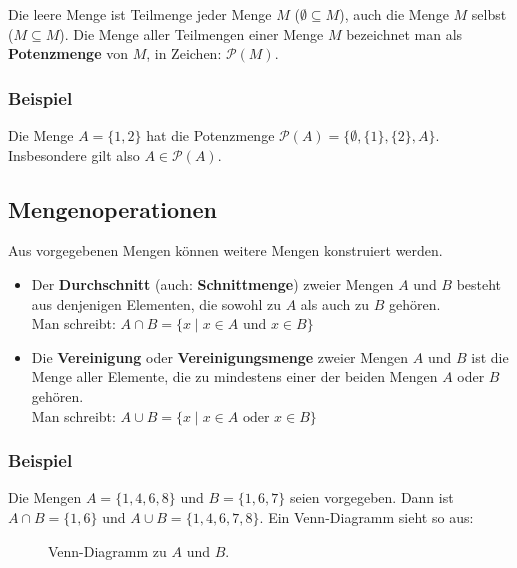 Die leere Menge ist Teilmenge jeder Menge $M$ ($\emptyset\subseteq M$), auch die Menge $M$ selbst ($M\subseteq M$). Die Menge aller Teilmengen einer Menge $M$ bezeichnet man als \textbf{Potenzmenge} von $M$, in Zeichen: $\mathcal{P}(M)$.

\subsubsection{Beispiel}

Die Menge $A=\{1,2\}$ hat die Potenzmenge $\mathcal{P}(A)=\{\emptyset,\{1\},\{2\},A\}$. Insbesondere gilt also $A\in\mathcal{P}(A)$.\beispielende

\subsection{Mengenoperationen}

Aus vorgegebenen Mengen können weitere Mengen konstruiert werden.

\begin{itemize}
  \item Der \textbf{Durchschnitt} (auch: \textbf{Schnittmenge}) zweier Mengen $A$ und $B$ besteht aus denjenigen Elementen, die sowohl zu $A$ als auch zu $B$ gehören.\\
  Man schreibt: $A\cap B = \{x \mid x\in A \text{ und } x\in B\}$
  \item Die \textbf{Vereinigung} oder \textbf{Vereinigungsmenge} zweier Mengen $A$ und $B$ ist die Menge aller Elemente, die zu mindestens einer der beiden Mengen $A$ oder $B$ gehören.\\
  Man schreibt: $A\cup B = \{x \mid x\in A \text{ oder } x\in B\}$
\end{itemize}

\subsubsection{Beispiel}

Die Mengen $A=\{1,4,6,8\}$ und $B=\{1,6,7\}$ seien vorgegeben. Dann ist $A\cap B=\{1,6\}$ und $A\cup B=\{1,4,6,7,8\}$. Ein Venn-Diagramm sieht so aus:

\begin{figure}[h]
  \centering
  \caption*{Venn-Diagramm zu $A$ und $B$.}
\end{figure}

